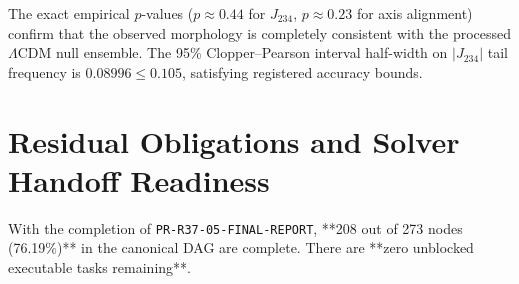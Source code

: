 \documentclass[11pt,a4paper]{article}
\begin{document}
\begin{table}[htbp]
\centering
\small
\caption{Planck PR4 Commander low-$\ell$ polarisation morphology statistics ($N=100$ MC ensemble).}
\vspace{2mm}
\label{tab:pr4}
\end{table}

The exact empirical $p$-values ($p \approx 0.44$ for $J_{234}$, $p \approx 0.23$ for axis alignment) confirm that the observed morphology is completely consistent with the processed $\Lambda\mathrm{CDM}$ null ensemble. The 95\% Clopper--Pearson interval half-width on $|J_{234}|$ tail frequency is $0.08996 \le 0.105$, satisfying registered accuracy bounds.

\section{Residual Obligations and Solver Handoff Readiness}

With the completion of \texttt{PR-R37-05-FINAL-REPORT}, **208 out of 273 nodes (76.19\%)** in the canonical DAG are complete. There are **zero unblocked executable tasks remaining**.
\end{document}
